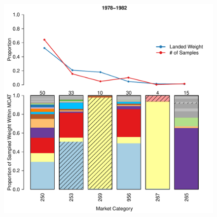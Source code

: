 \documentclass[12pt]{article}
\begin{document}
%
\begin{landscape}
\begin{figure}[h!]
\centering
\vspace{-1.2cm}
\includegraphics[height=\textheight]{./pictures/1978to1982Bar3.pdf}

\end{figure}
\end{landscape}
\end{document}
